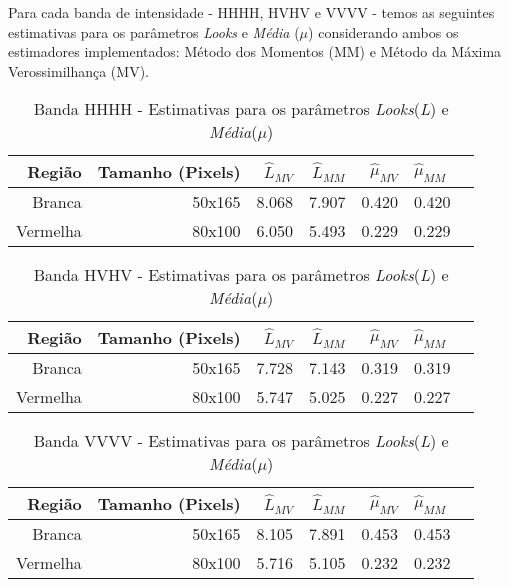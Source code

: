 Para cada banda de intensidade - HHHH, HVHV e VVVV - temos as seguintes estimativas para os parâmetros \textit{Looks} e \textit{Média} ($\mu$) considerando ambos os estimadores implementados: Método dos Momentos (MM) e Método da Máxima Verossimilhança (MV).
\begin{table}[H]
\centering
\caption{Banda HHHH - Estimativas para os parâmetros \textit{Looks}(\textit{L}) e \textit{Média}(\textit{$\mu$})}
\vspace{0.2cm}
\begin{tabular}{r|r|r|r|r|lr}
\hline
Região & Tamanho (Pixels) & $\hat{L}_{MV}$ & $\hat{L}_{MM}$ & $\hat{\mu}_{MV}$ & $\hat{\mu}_{MM}$  \\ 
\hline                               
Branca & 50x165 & 8.068 & 7.907 & 0.420 & 0.420 \\
Vermelha & 80x100 & 6.050 & 5.493 & 0.229 & 0.229\\
\end{tabular}
\end{table}
\begin{table}[H]
\centering
\caption{Banda HVHV - Estimativas para os parâmetros \textit{Looks}(\textit{L}) e \textit{Média}(\textit{$\mu$})}
\vspace{0.2cm}
\begin{tabular}{r|r|r|r|r|lr}
\hline
Região & Tamanho (Pixels) & $\hat{L}_{MV}$ & $\hat{L}_{MM}$ & $\hat{\mu}_{MV}$ & $\hat{\mu}_{MM}$  \\ 
\hline                               
Branca & 50x165 & 7.728 & 7.143 & 0.319 & 0.319 \\
Vermelha & 80x100 & 5.747 & 5.025 & 0.227 & 0.227\\
\end{tabular}
\end{table}
\begin{table}[H]
\centering
\caption{Banda VVVV - Estimativas para os parâmetros \textit{Looks}(\textit{L}) e \textit{Média}(\textit{$\mu$})}
\vspace{0.2cm}
\begin{tabular}{r|r|r|r|r|lr}
\hline
Região & Tamanho (Pixels) & $\hat{L}_{MV}$ & $\hat{L}_{MM}$ & $\hat{\mu}_{MV}$ & $\hat{\mu}_{MM}$  \\ 
\hline                               
Branca & 50x165 & 8.105 & 7.891 & 0.453 & 0.453 \\
Vermelha & 80x100 & 5.716 & 5.105 & 0.232 & 0.232\\
\end{tabular}
\end{table}

